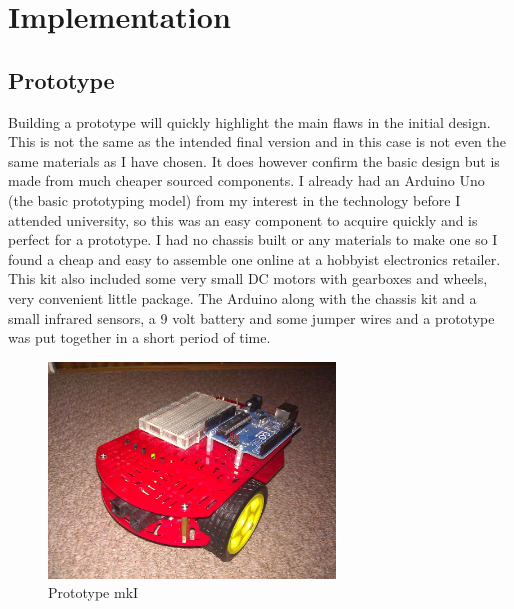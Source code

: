 \chapter{Implementation}



\section{Prototype}
Building a prototype will quickly highlight the main flaws in the initial design.  This is not the same as the intended final version and in this case is not even the same materials as I have chosen.  It does however confirm the basic design but is made from much cheaper sourced components.  I already had an Arduino Uno (the basic prototyping model) from my interest in the technology before I attended university, so this was an easy component to acquire quickly and is perfect for a prototype.  I had no chassis built or any materials to make one so I found a cheap and easy to assemble one online at a hobbyist electronics retailer.  This kit also included some very small DC motors with gearboxes and wheels, very convenient little package.  The Arduino along with the chassis kit and a small infrared sensors, a 9 volt battery and some jumper wires and a prototype was put together in a short period of time.
\begin{figure}[H]
\centering
        \includegraphics[width=3.0in] {Images/tria-mkI.jpg}
        \caption{Prototype mkI}
        \label{Prototype mkI}
\end{figure}

